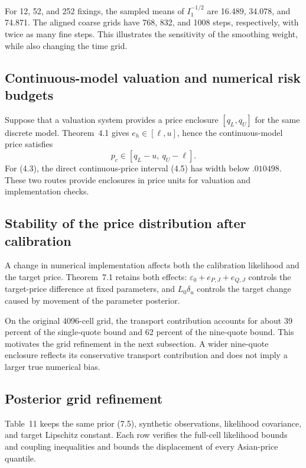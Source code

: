 \documentclass[11pt,a4paper]{article}
\begin{document}
For 12, 52, and 252 fixings, the sampled means of \(I_1^{-1/2}\) are 16.489,
34.078, and 74.871. The aligned coarse grids have 768, 832, and 1008 steps,
respectively, with twice as many fine steps. This illustrates the sensitivity
of the smoothing weight, while also changing the time grid.

\subsection{Continuous-model valuation and numerical risk budgets}

Suppose that a valuation system provides a price enclosure \([q_L,q_U]\) for the same
discrete model. Theorem~4.1 gives \(e_h\in[\ell,u]\), hence the continuous-model price satisfies
\[
p_c\in[q_L-u,\ q_U-\ell].
\tag{8.1}
\]
For (4.3), the direct continuous-price interval (4.5) has width below
\(.010498\). These two routes provide enclosures in price units for valuation
and implementation checks.

\subsection{Stability of the price distribution after calibration}

A change in numerical implementation affects both the calibration likelihood and the
target price. Theorem~7.1 retains both effects:
\(\varepsilon_0+e_{P,J}+e_{Q,J}\) controls the target-price difference at fixed parameters,
and \(L_0\delta_u\) controls the target change caused by movement of the parameter posterior.

On the original 4096-cell grid, the transport contribution accounts for about
39 percent of the single-quote bound and 62 percent of the nine-quote bound.
This motivates the grid refinement in the next subsection. A wider nine-quote
enclosure reflects its conservative transport contribution and does not imply
a larger true numerical bias.

\subsection{Posterior grid refinement}

Table~11 keeps the same prior (7.5), synthetic observations, likelihood
covariance, and target Lipschitz constant. Each row verifies the full-cell
likelihood bounds and coupling inequalities and bounds the displacement of
every Asian-price quantile.
\end{document}
